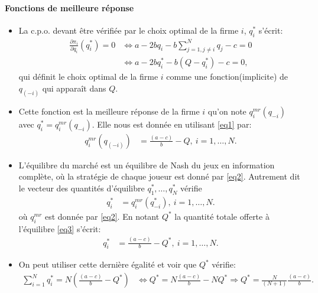 \documentclass[notes, ignorenonframetext, compress, 10pt, xcolor=svgnames, aspectratio=169]{beamer}
\begin{document}
\begin{frame}[allowframebreaks]{\insertsection}
\framesubtitle{Fonctions de meilleure réponse}
    \begin{itemize}
        \item La c.p.o. devant être vérifiée par le choix optimal de la firme $i$, $q_i^*$ s'écrit: 
        \begin{align}
            \frac{\partial \pi_i}{\partial q_i}(q_i^*) =0 &\Leftrightarrow a-2bq_i -b\sum_{j=1, j\neq i }^N q_j - c = 0\\
            &\Leftrightarrow  a-2bq_i^* -b\left(Q - q_i^*\right) - c= 0,
            \label{eq1}
        \end{align}
         qui définit le choix optimal de la firme $i$ comme une fonction(implicite) de $q_{(-i)}$ qui apparaît 
         dans $Q$. 
         \item Cette fonction est la meilleure réponse de la firme $i$ qu'on note $q^{mr}_i(q_{-i})$ avec 
         $q_i^* = q^{mr}_i(q_{-i})$. Elle nous est donnée en utilisant \eqref{eq1} par: 
        \begin{align} 
            q_i^{mr}(q_{(-i)}) &= \frac{(a-c)}{b} - Q, \ i=1, \ldots, N.
            \label{eq2}
        \end{align}
           \item L'équilibre du marché est un équilibre de Nash du jeux en information complète, où
           la stratégie de chaque joueur est donné par \eqref{eq2}. 
           Autrement dit le vecteur des quantités d'équilibre $q_1^*, \ldots, q_N^*$ vérifie 
           \begin{align}
               q_i^*&= q_i^{mr}(q_{-i}^*), \ i=1, \ldots, N.
               \label{eq3}
           \end{align}
           où $q_i^{mr}$ est donnée par \eqref{eq2}. En notant $Q^*$ la quantité totale offerte 
           à l'équilibre \eqref{eq3} s'écrit:
           \begin{align*}
            q_i^*&=\frac{(a-c)}{b} - Q^*, \ i=1, \ldots, N.
           \end{align*}
           \item On peut utiliser cette dernière égalité et voir que $Q^*$ vérifie:
           \begin{align*}
            \sum_{i=1}^N  q_i^* = N\left(\frac{(a-c)}{b} - Q^*\right)
            &\Leftrightarrow Q^* = N\frac{(a-c)}{b} - NQ^*
            \Rightarrow  Q^* = \frac{N}{(N+1)}\frac{(a-c)}{b}.
           \end{align*}

\end{itemize}
\end{frame}
\end{document}
